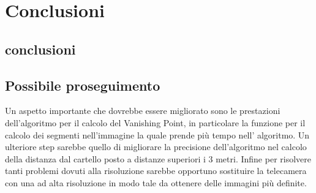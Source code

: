 
\chapter{Conclusioni}

	\section{conclusioni}
	
	\section{Possibile proseguimento}

		Un aspetto importante che dovrebbe essere migliorato sono le prestazioni dell'algoritmo per il calcolo del Vanishing Point, in particolare la funzione per il calcolo dei segmenti nell'immagine la quale prende più tempo nell' algoritmo. Un ulteriore step sarebbe quello di migliorare la precisione dell'algoritmo nel calcolo della distanza dal cartello posto a distanze superiori i 3 metri. Infine per risolvere tanti problemi dovuti alla risoluzione sarebbe opportuno sostituire la telecamera con una ad alta risoluzione in modo tale da ottenere delle immagini più definite.

		